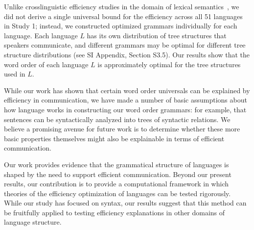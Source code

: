 \documentclass[9pt,twocolumn,twoside,lineno]{pnas-new}
\begin{document}
Unlike crosslinguistic efficiency studies in the domain of lexical semantics~\cite{kemp2012kinship,regier2015word,zaslavsky2018efficient}, we did not derive a single universal bound for the efficiency across all 51 languages in Study 1; instead, we constructed optimized grammars individually for each language.
Each language $L$ has its own distribution of tree structures that speakers communicate, and different grammars may be optimal for different tree structure distributions (see SI Appendix, Section S3.5).
Our results show that the word order of each language $L$ is approximately optimal for the tree structures used in $L$.

While our work has shown that certain word order universals can be explained by efficiency in communication, we have made a number of basic assumptions about how language works in constructing our word order grammars: for example, that sentences can be syntactically analyzed into trees of syntactic relations. We believe a promising avenue for future work is to determine whether these more basic properties themselves might also be explainable in terms of efficient communication.

Our work provides evidence that the grammatical structure of languages is shaped by the need to support efficient communication.
Beyond our present results, our contribution is to provide a computational framework in which theories of the efficiency optimization of languages can be tested rigorously.
While our study has focused on syntax, our results suggest that this method can be fruitfully applied to testing efficiency explanations in other domains of language structure.
\end{document}
